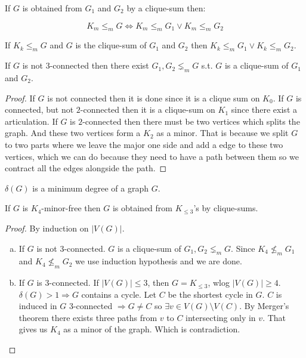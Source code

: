 \begin{observ}
	If $G$ is obtained from $G_{1}$ and $G_{2}$ by a clique-sum then:
	
	$$
	K_{m} \leq_{m} G \Leftrightarrow K_{m} \leq_{m} G_{1} \lor K_{m} \leq_{m} G_{2}
	$$
\end{observ}

\begin{lemma}
	If $K_{k} \leq_{m} G$ and $G$ is the clique-sum of $G_{1}$ and $G_{2}$ then $K_{k} \leq_{m} G_{1} \lor K_{k} \leq_{m} G_{2}$.
\end{lemma}

\begin{lemma}
	If $G$ is not $3$-connected then there exist $G_{1}, G_{2} \lneq_{m} G$ s.t. $G$ is a clique-sum of $G_{1}$ and $G_{2}$.
\end{lemma}

\begin{proof}
	If $G$ is not connected then it is done since it is a clique sum on $K_{0}$. If $G$ is connected, but not $2$-connected then it is a clique-sum on $K_{1}$ since there exist a articulation. If $G$ is $2$-connected then there must be two vertices which splits the graph. And these two vertices form a $K_{2}$ as a minor. That is because we split $G$ to two parts where we leave the major one side and add a edge to these two vertices, which we can do because they need to have a path between them so we contract all the edges alongside the path.
\end{proof}

\begin{defn}
	$\delta(G)$ is a minimum degree of a graph $G$.
\end{defn}

\begin{thm}
	If $G$ is $K_{4}$-minor-free then $G$ is obtained from $K_{\leq 3}$'s by clique-sums.
\end{thm}

\begin{proof}
	By induction on $|V(G)|$.
	
	\begin{enumerate}[(a)]
		\item If $G$ is not 3-connected. $G$ is a clique-sum of $G_{1},G_{2} \lneq_{m} G$. Since $K_{4} \nleq_{m} G_{1}$ and $K_{4} \nleq_{m} G_{2}$ we use induction hypothesis and we are done.
		\item If $G$ is 3-connected. If $|V(G)| \leq 3$, then $G = K_{\leq 3}$, wlog $|V(G)| \geq 4$. $\delta(G) > 1 \Rightarrow G$ contains a cycle. Let $C$ be the shortest cycle in $G$. $C$ is induced in $G$ 3-connected $\Rightarrow G \neq C$ so $\exists v \in V(G) \setminus V(C)$. By Merger's theorem there exists three paths from $v$ to $C$ intersecting only in $v$. That gives us $K_{4}$ as a minor of the graph. Which is contradiction.
	\end{enumerate}
\end{proof}

